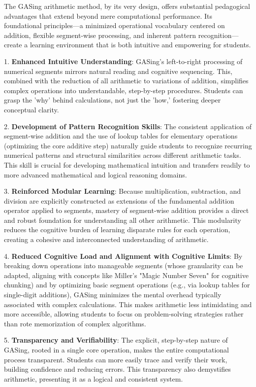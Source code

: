 The GASing arithmetic method, by its very design, offers substantial pedagogical advantages that extend beyond mere computational performance. Its foundational principles—a minimized operational vocabulary centered on addition, flexible segment-wise processing, and inherent pattern recognition—create a learning environment that is both intuitive and empowering for students.

1.  \textbf{Enhanced Intuitive Understanding}: GASing's left-to-right processing of numerical segments mirrors natural reading and cognitive sequencing. This, combined with the reduction of all arithmetic to variations of addition, simplifies complex operations into understandable, step-by-step procedures. Students can grasp the 'why' behind calculations, not just the 'how,' fostering deeper conceptual clarity.

2.  \textbf{Development of Pattern Recognition Skills}: The consistent application of segment-wise addition and the use of lookup tables for elementary operations (optimizing the core additive step) naturally guide students to recognize recurring numerical patterns and structural similarities across different arithmetic tasks. This skill is crucial for developing mathematical intuition and transfers readily to more advanced mathematical and logical reasoning domains.

3.  \textbf{Reinforced Modular Learning}: Because multiplication, subtraction, and division are explicitly constructed as extensions of the fundamental addition operator applied to segments, mastery of segment-wise addition provides a direct and robust foundation for understanding all other arithmetic. This modularity reduces the cognitive burden of learning disparate rules for each operation, creating a cohesive and interconnected understanding of arithmetic.

4.  \textbf{Reduced Cognitive Load and Alignment with Cognitive Limits}: By breaking down operations into manageable segments (whose granularity can be adapted, aligning with concepts like Miller's "Magic Number Seven" for cognitive chunking) and by optimizing basic segment operations (e.g., via lookup tables for single-digit additions), GASing minimizes the mental overhead typically associated with complex calculations. This makes arithmetic less intimidating and more accessible, allowing students to focus on problem-solving strategies rather than rote memorization of complex algorithms.

5.  \textbf{Transparency and Verifiability}: The explicit, step-by-step nature of GASing, rooted in a single core operation, makes the entire computational process transparent. Students can more easily trace and verify their work, building confidence and reducing errors. This transparency also demystifies arithmetic, presenting it as a logical and consistent system.

